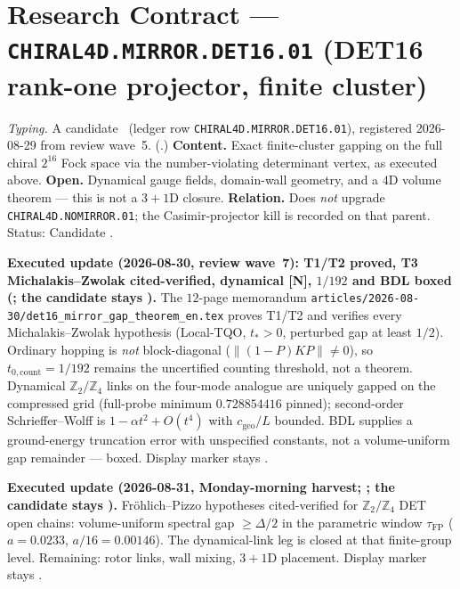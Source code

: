\section*{Research Contract --- \texttt{CHIRAL4D.MIRROR.DET16.01} (DET16 rank-one projector, finite cluster)}
\noindent\emph{Typing.} A candidate \mC\ (ledger row \texttt{CHIRAL4D.MIRROR.DET16.01}),
registered 2026-08-29 from review wave~5.
(.)
\textbf{Content.}  Exact finite-cluster gapping on the full chiral $2^{16}$ Fock space via the
number-violating determinant vertex, as executed above.  \textbf{Open.}  Dynamical gauge fields,
domain-wall geometry, and a $4$D volume theorem --- this is not a $3{+}1$D closure.
\textbf{Relation.}  Does \emph{not} upgrade \texttt{CHIRAL4D.NOMIRROR.01}; the Casimir-projector
kill is recorded on that parent.  Status: Candidate \mC.

\par\smallskip\noindent\textbf{Executed update (2026-08-30, review wave~7): T1/T2 proved, T3
Michalakis--Zwolak cited-verified, dynamical [N], $1/192$ and BDL boxed
(;
the candidate stays \mC).}
The $12$-page memorandum
\texttt{articles/2026-08-30/\allowbreak det16\_\allowbreak mirror\_\allowbreak gap\_\allowbreak theorem\_\allowbreak en.tex}
proves T1/T2 and verifies every Michalakis--Zwolak hypothesis (Local-TQO, $t_*>0$, perturbed
gap at least $1/2$).  Ordinary hopping is \emph{not} block-diagonal
($\lVert(1-P)KP\rVert\neq0$), so $t_{0,\mathrm{count}}=1/192$ remains the uncertified counting
threshold, not a theorem.  Dynamical $\mathbb Z_2/\mathbb Z_4$ links on the four-mode analogue
are uniquely gapped on the compressed grid (full-probe minimum $0.728854416$ pinned);
second-order Schrieffer--Wolff is $1-\alpha t^2+O(t^4)$ with $c_{\mathrm{geo}}/L$ bounded.
BDL supplies a ground-energy truncation error with unspecified constants, not a volume-uniform
gap remainder --- boxed.  Display marker stays \mC.

\par\smallskip\noindent\textbf{Executed update (2026-08-31, Monday-morning harvest;
;
the candidate stays \mC).}
Fröhlich--Pizzo hypotheses cited-verified for $\mathbb Z_2/\mathbb Z_4$ DET open chains:
volume-uniform spectral gap $\ge\Delta/2$ in the parametric window $\tau_{\mathrm{FP}}$
($a=0.0233$, $a/16=0.00146$).  The dynamical-link leg is closed at that finite-group
level.  Remaining: rotor links, wall mixing, $3{+}1$D placement.  Display marker stays \mC.

